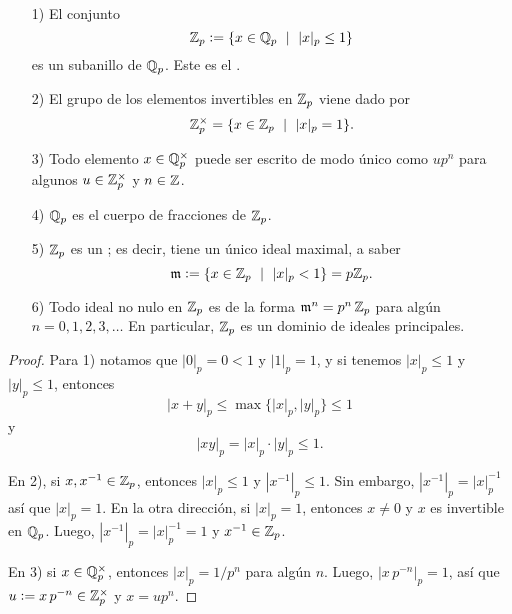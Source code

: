 \documentclass{article}
\numberwithin{equation}{section}
\theoremstyle{definition}
\begin{document}
\begin{teorema}
  \label{thm:definicion-y-propiedades-de-Zp}
  ~

  \begin{enumerate}
  \item[1)] El conjunto
    $$\mathbb{Z}_p \mathrel{\mathop:}= \{ x \in \mathbb{Q}_p ~\mid~ |x|_p \le 1 \}$$
    es un subanillo de $\mathbb{Q}_p$. Este es el .

  \item[2)] El grupo de los elementos invertibles en $\mathbb{Z}_p$ viene dado por
    $$\mathbb{Z}_p^\times = \{ x\in\mathbb{Z}_p ~\mid~ |x|_p = 1 \}.$$

  \item[3)] Todo elemento $x\in \mathbb{Q}_p^\times$ puede ser escrito de modo único
    como $up^n$ para algunos $u \in \mathbb{Z}_p^\times$ y $n\in \mathbb{Z}$.

  \item[4)] $\mathbb{Q}_p$ es el cuerpo de fracciones de $\mathbb{Z}_p$.

  \item[5)] $\mathbb{Z}_p$ es un ; es decir, tiene un único ideal
    maximal, a saber
    $$\mathfrak{m} \mathrel{\mathop:}= \{ x\in\mathbb{Z}_p ~\mid~ |x|_p < 1 \} = p\mathbb{Z}_p.$$

  \item[6)] Todo ideal no nulo en $\mathbb{Z}_p$ es de la forma
    $\mathfrak{m}^n = p^n\,\mathbb{Z}_p$ para algún $n = 0,1,2,3,\ldots$ En particular,
    $\mathbb{Z}_p$ es un dominio de ideales principales.
  \end{enumerate}

  \begin{proof}
    Para 1) notamos que $|0|_p = 0 < 1$ y $|1|_p = 1$, y si tenemos
    $|x|_p \le 1$ y $|y|_p \le 1$, entonces
    $$|x+y|_p \le \max \{ |x|_p, |y|_p \} \le 1$$
    y
    $$|xy|_p = |x|_p\cdot |y|_p \le 1.$$

    \vspace{1em}

    En 2), si $x, x^{-1}\in \mathbb{Z}_p$, entonces $|x|_p \le 1$ y
    $|x^{-1}|_p \le 1$. Sin embargo, $|x^{-1}|_p = |x|_p^{-1}$ así que
    $|x|_p = 1$. En la otra dirección, si $|x|_p = 1$, entonces $x \ne 0$
    y $x$ es invertible en $\mathbb{Q}_p$. Luego, $|x^{-1}|_p = |x|_p^{-1} = 1$
    y $x^{-1} \in \mathbb{Z}_p$.

    \vspace{1em}

    En 3) si $x \in \mathbb{Q}_p^\times$, entonces $|x|_p = 1/p^n$ para algún
    $n$. Luego, $|x\,p^{-n}|_p = 1$, así que $u \mathrel{\mathop:}= x\,p^{-n} \in \mathbb{Z}_p^\times$
    y $x = up^n$.


\end{proof}
\end{teorema}
\end{document}
